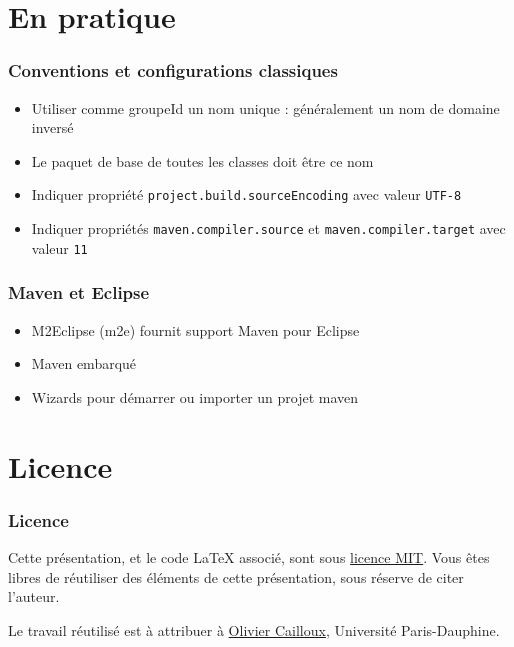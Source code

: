 \documentclass[english, french]{beamer}
\begin{document}
\section{En pratique}
\begin{frame}
	\frametitle{Conventions et configurations classiques}
	\begin{itemize}
		\item Utiliser comme groupeId un nom unique : généralement un nom de domaine inversé
		\item Le paquet de base de toutes les classes doit être ce nom
		\item Indiquer propriété \texttt{project.build.sourceEncoding} avec valeur \texttt{UTF-8}
		\item Indiquer propriétés \texttt{maven.compiler.source} et \texttt{maven.compiler.target} avec valeur \texttt{11}
	\end{itemize}
\end{frame}

\begin{frame}
	\frametitle{Maven et Eclipse}
	\begin{itemize}
		\item M2Eclipse (m2e) fournit support Maven pour Eclipse
		\item Maven embarqué
		\item Wizards pour démarrer ou importer un projet maven
	\end{itemize}
\end{frame}

\appendix

\section{Licence}
\begin{frame}
	\frametitle{Licence}
	Cette présentation, et le code LaTeX associé, sont sous \href{https://opensource.org/licenses/MIT}{licence MIT}. Vous êtes libres de réutiliser des éléments de cette présentation, sous réserve de citer l’auteur.
	
	Le travail réutilisé est à attribuer à \href{http://www.lamsade.dauphine.fr/~ocailloux/}{Olivier Cailloux}, Université Paris-Dauphine.
\end{frame}
\end{document}
